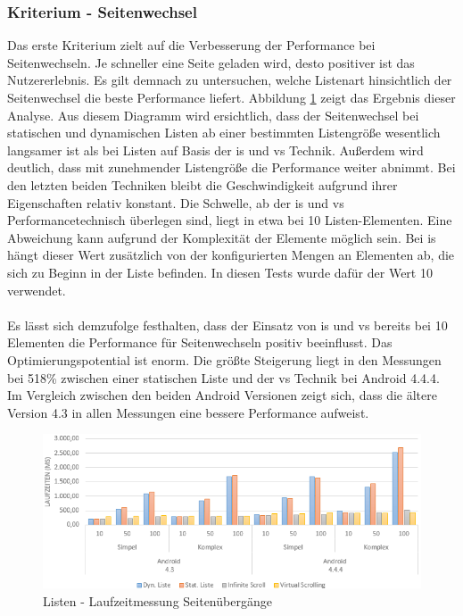 \subsubsection{Kriterium - Seitenwechsel}
Das erste Kriterium zielt auf die Verbesserung der Performance bei Seitenwechseln. Je schneller eine Seite geladen wird, desto positiver ist das Nutzererlebnis. Es gilt demnach zu untersuchen, welche Listenart hinsichtlich der Seitenwechsel die beste Performance liefert. Abbildung \ref{lists-runtime-pagetransitions} zeigt das Ergebnis dieser Analyse. Aus diesem Diagramm wird ersichtlich, dass der Seitenwechsel bei statischen und dynamischen Listen ab einer bestimmten Listengröße wesentlich langsamer ist als bei Listen auf Basis der \gls{is} und \gls{vs} Technik. Außerdem wird deutlich, dass mit zunehmender Listengröße die Performance weiter abnimmt. Bei den letzten beiden Techniken bleibt die Geschwindigkeit aufgrund ihrer Eigenschaften relativ konstant. Die Schwelle, ab der \gls{is} und \gls{vs} Performancetechnisch überlegen sind, liegt in etwa bei 10 Listen-Elementen. Eine Abweichung kann aufgrund der Komplexität der Elemente möglich sein. Bei \gls{is} hängt dieser Wert zusätzlich von der konfigurierten Mengen an Elementen ab, die sich zu Beginn in der Liste befinden. In diesen Tests wurde dafür der Wert 10 verwendet. 
\\\\
Es lässt sich demzufolge festhalten, dass der Einsatz von \gls{is} und \gls{vs} bereits bei 10 Elementen die Performance für Seitenwechseln positiv beeinflusst. Das Optimierungspotential ist enorm. Die größte Steigerung liegt in den Messungen bei 518\% zwischen einer statischen Liste und der \gls{vs} Technik bei Android 4.4.4. Im Vergleich zwischen den beiden Android Versionen zeigt sich, dass die ältere Version 4.3 in allen Messungen eine bessere Performance aufweist.   
\begin{figure}[h]
	\centering
	\includegraphics[scale=0.7]{Bilder/Diagramme/List-PageTransition.png}
	\caption{Listen - Laufzeitmessung Seitenübergänge}
	\label{lists-runtime-pagetransitions}
\end{figure}

